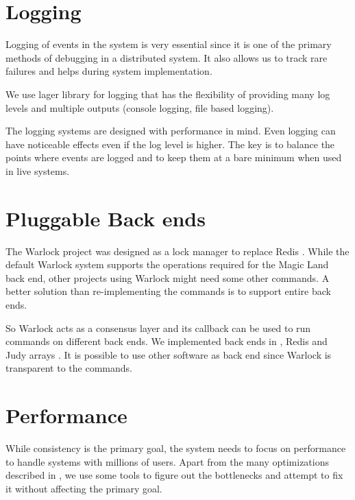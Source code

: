 \section{Logging}

Logging of events in the system is very essential since it is one of the primary
methods of debugging in a distributed system. It also allows us to track rare
failures and helps during system implementation.

We use lager \citep{lager} library for logging that has the flexibility of
providing many log levels%
and multiple outputs (console logging, file based logging).

The logging systems are designed with performance in mind. Even logging can have
noticeable effects even if the log level is higher. The key is to balance the
points where events are logged and to keep them at a bare minimum when used in
live systems.

\section{Pluggable Back ends}

The Warlock project was designed as a lock manager to replace Redis
\citep{redis}. While the default Warlock system supports the operations
required for the Magic Land back end, other projects using Warlock might need
some other commands. A better solution than re-implementing the commands is to
support entire back ends.

So Warlock acts as a consensus layer and its callback can be used to run
commands on different back ends. We implemented back ends in , Redis
and Judy arrays \citep{judy}. It is possible to use other software as back end
since Warlock is transparent to the commands.

\section{Performance}

While consistency is the primary goal, the system needs to focus on performance
to handle systems with millions of users. Apart from the many optimizations
described in , we use some tools to figure out
the bottlenecks and attempt to fix it without affecting the primary goal.

